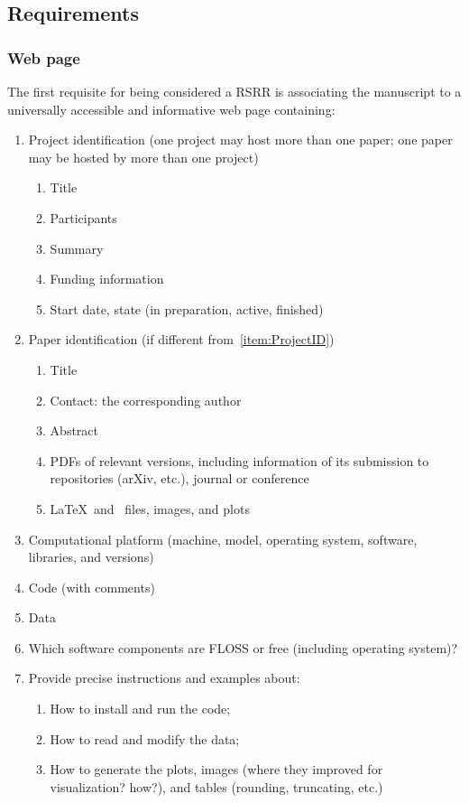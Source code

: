 \documentclass[journal,twoside]{IEEEtran}
\begin{document}
\subsection{Requirements}

\subsubsection{Web page}\label{Sec:WebPage}
The first requisite for being considered a RSRR is associating the manuscript to a universally accessible and informative web page containing:
\begin{enumerate}
	\item\label{item:ProjectID} Project identification (one project may host more than one paper; one paper may be hosted by more than one project)
	\begin{enumerate}
		\item Title
		\item Participants
		\item Summary
		\item Funding information
		\item Start date, state (in preparation, active, finished)
	\end{enumerate}
	\item Paper identification (if different from~\ref{item:ProjectID})
	\begin{enumerate}
		\item Title
		\item Contact: the corresponding author
		\item Abstract
		\item PDFs of relevant versions, including information of its submission to repositories (arXiv, etc.), journal or conference
		\item\label{item:SourceDocumentFiles} \LaTeX\ and \BibTeX\ files, images, and plots
	\end{enumerate}
	\item\label{item:Platform} Computational platform (machine, model, operating system, software, libraries, and versions)
	\item Code (with comments)
	\item Data
	\item Which software components are FLOSS or free (including operating system)?
	\item Provide precise instructions and examples about:
	\begin{enumerate}
		\item How to install and run the code;
		\item How to read and modify the data;
		\item How to generate the plots, images (where they improved for visualization? how?), and tables (rounding, truncating, etc.)
	\end{enumerate}
\end{enumerate}
\end{document}

